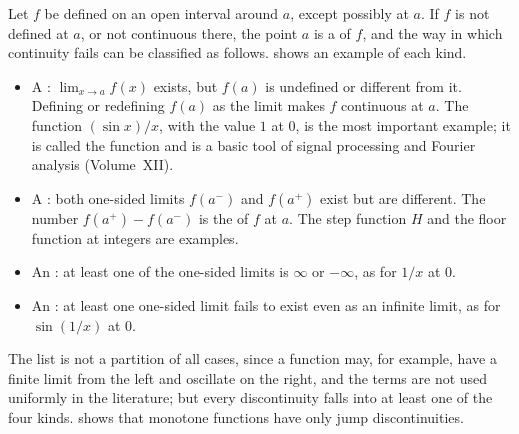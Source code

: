 Let $f$ be defined on an open interval around $a$, except possibly at $a$. If $f$ is not defined at $a$, or not continuous there, the point $a$ is a  of $f$, and the way in which continuity fails can be classified as follows.  shows an example of each kind.
\begin{itemize}
\item A : $\lim_{x\to a}f(x)$ exists, but $f(a)$ is undefined or different from it. Defining or redefining $f(a)$ as the limit makes $f$ continuous at $a$. The function $(\sin x)/x$, with the value $1$ at $0$, is the most important example; it is called the  function and is a basic tool of signal processing and Fourier analysis (Volume~XII).
\item A : both one-sided limits $f(a^-)$ and $f(a^+)$ exist but are different. The number $f(a^+)-f(a^-)$ is the  of $f$ at $a$. The step function $H$ and the floor function at integers are examples.
\item An : at least one of the one-sided limits is $\infty$ or $-\infty$, as for $1/x$ at $0$.
\item An : at least one one-sided limit fails to exist even as an infinite limit, as for $\sin(1/x)$ at $0$.
\end{itemize}
The list is not a partition of all cases, since a function may, for example, have a finite limit from the left and oscillate on the right, and the terms are not used uniformly in the literature; but every discontinuity falls into at least one of the four kinds.  shows that monotone functions have only jump discontinuities.

